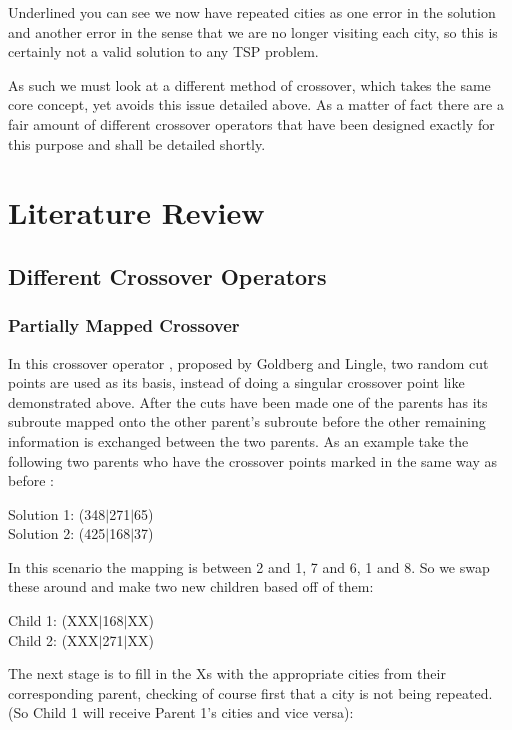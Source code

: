 \documentclass[11pt,a4paper,titlepage]{article}
\begin{document}
Underlined you can see we now have repeated cities as one error in the solution and another error in the sense that we are no longer visiting each city, so this is certainly not a valid solution to any TSP problem.

As such we must look at a different method of crossover, which takes the same core concept, yet avoids this issue detailed above. As a matter of fact there are a fair amount of different crossover operators that have been designed exactly for this purpose and shall be detailed shortly.

\section{Literature Review}

\subsection{Different Crossover Operators}

\subsubsection{Partially Mapped Crossover}

In this crossover operator \cite{GACrossover}, proposed by Goldberg and Lingle, two random cut points are used as its basis, instead of doing a singular crossover point like demonstrated above. After the cuts have been made one of the parents has its subroute mapped onto the other parent's subroute before the other remaining information is exchanged between the two parents. As an example take the following two parents who have the crossover points marked in the same way as before \cite{GACrossover}:

\begin{center}\Large
Solution 1: (348$|$271$|$65)\\
Solution 2: (425$|$168$|$37)
\end{center}

In this scenario the mapping is between 2 and 1, 7 and 6, 1 and 8. So we swap these around and make two new children based off of them:

\begin{center}\Large
Child 1: (XXX$|$168$|$XX)\\
Child 2: (XXX$|$271$|$XX)
\end{center}

The next stage is to fill in the Xs with the appropriate cities from their corresponding parent, checking of course first that a city is not being repeated. (So Child 1 will receive Parent 1's cities and vice versa):
\end{document}
